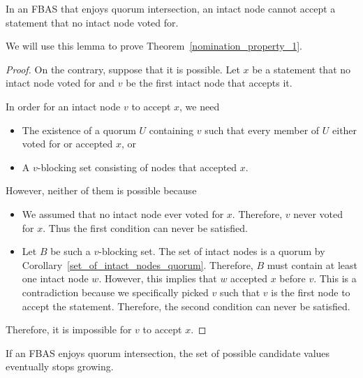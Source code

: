 \begin{lem}\label{intact_cannot_accept_no_vote}
    In an FBAS that enjoys quorum intersection, an intact node cannot accept a statement that no intact node voted for.
\end{lem}

We will use this lemma to prove Theorem~\ref{nomination_property_1}.

\begin{proof}
    On the contrary, suppose that it is possible.
    Let $x$ be a statement that no intact node voted for and $v$ be the first intact node that accepts it.

    In order for an intact node $v$ to accept $x$, we need
    \begin{itemize}
        \item
            The existence of a quorum $U$ containing $v$ such that every member of $U$ either voted for or accepted $x$, or
        \item
            A $v$-blocking set consisting of nodes that accepted $x$.
    \end{itemize}

    However, neither of them is possible because
    \begin{itemize}
        \item
            We assumed that no intact node ever voted for $x$.
            Therefore, $v$ never voted for $x$.
            Thus the first condition can never be satisfied.
        \item
            Let $B$ be such a $v$-blocking set.
            The set of intact nodes is a quorum by Corollary~\ref{set_of_intact_nodes_quorum}.
            Therefore, $B$ must contain at least one intact node $w$.
            However, this implies that $w$ accepted $x$ before $v$.
            This is a contradiction because we specifically picked $v$ such that $v$ is the first node to accept the statement.
            Therefore, the second condition can never be satisfied.
    \end{itemize}

    Therefore, it is impossible for $v$ to accept $x$.
\end{proof}

\begin{thm}\label{nomination_property_1}
    If an FBAS enjoys quorum intersection, the set of possible candidate values eventually stops growing.
\end{thm}

